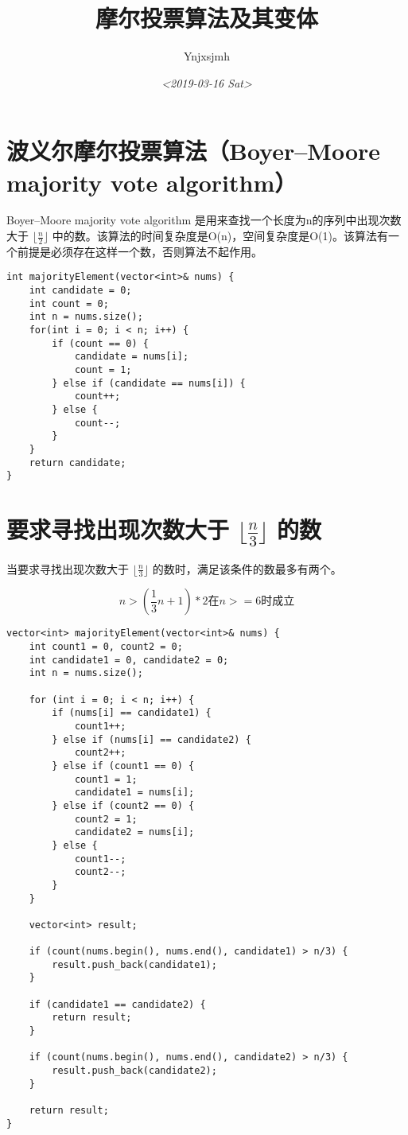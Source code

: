 \documentclass[11pt]{article}
\author{Ynjxsjmh}
\date{\textit{<2019-03-16 Sat>}}
\title{摩尔投票算法及其变体}
\begin{document}
\maketitle
\tableofcontents



\section{波义尔摩尔投票算法（Boyer–Moore majority vote algorithm）}
\label{sec:orgc33ba11}
Boyer–Moore majority vote algorithm 是用来查找一个长度为n的序列中出现次数大于 \(\lfloor\frac{n}{2}\rfloor\) 中的数。该算法的时间复杂度是O(n)，空间复杂度是O(1)。该算法有一个前提是必须存在这样一个数，否则算法不起作用。

\begin{verbatim}
int majorityElement(vector<int>& nums) {
    int candidate = 0;
    int count = 0;
    int n = nums.size();
    for(int i = 0; i < n; i++) {
        if (count == 0) {
            candidate = nums[i];
            count = 1;
        } else if (candidate == nums[i]) {
            count++;
        } else {
            count--;
        }
    }
    return candidate;
}
\end{verbatim}

\section{要求寻找出现次数大于 \(\lfloor\frac{n}{3}\rfloor\) 的数}
\label{sec:org29004f3}
当要求寻找出现次数大于 \(\lfloor\frac{n}{3}\rfloor\) 的数时，满足该条件的数最多有两个。

$$
n > (\frac{1}{3}n + 1) * 2 在 n >= 6 时成立
$$

\begin{verbatim}
vector<int> majorityElement(vector<int>& nums) {
    int count1 = 0, count2 = 0;
    int candidate1 = 0, candidate2 = 0;
    int n = nums.size();

    for (int i = 0; i < n; i++) {
        if (nums[i] == candidate1) {
            count1++;
        } else if (nums[i] == candidate2) {
            count2++;
        } else if (count1 == 0) {
            count1 = 1;
            candidate1 = nums[i];
        } else if (count2 == 0) {
            count2 = 1;
            candidate2 = nums[i];
        } else {
            count1--;
            count2--;
        }
    }

    vector<int> result;

    if (count(nums.begin(), nums.end(), candidate1) > n/3) {
        result.push_back(candidate1);
    }

    if (candidate1 == candidate2) {
        return result;
    }

    if (count(nums.begin(), nums.end(), candidate2) > n/3) {
        result.push_back(candidate2);
    }

    return result;
}
\end{verbatim}
\end{document}
